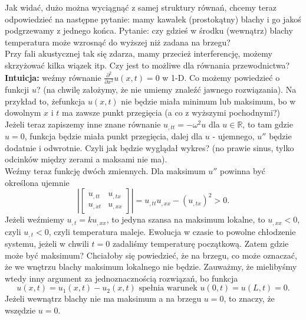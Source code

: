 \documentclass[../main.tex]{subfiles}
\begin{document}
Jak widać, dużo można wyciągnąć z samej struktury równań, chcemy teraz odpowiedzieć na następne pytanie: mamy kawałek (prostokątny) blachy i go jakoś podgrzewamy z jednego końca. Pytanie: czy gdzieś w środku (wewnątrz) blachy temperatura może wzrosnąć do wyższej niż zadana na brzegu?\\
Przy fali akustycznej tak się zdarza, mamy przecież interferencję, możemy skrzyżować kilka wiązek itp. Czy jest to możliwe dla równania przewodnictwa?\\
\textbf{Intuicja:} weźmy równanie $\frac{\partial ^2}{\partial x^2} u(x,t) = 0$ w 1-D. Co możemy powiedzieć o funkcji $u$? (na chwilę założymy, że nie umiemy znaleźć jawnego rozwiązania). Na przykład to, żefunkcja $u(x,t)$ nie będzie miała minimum lub maksimum, bo w dowolnym $x$ i $t$ ma zawsze punkt przegięcia (a co z wyższymi pochodnymi?)\\
Jeżeli teraz zapiszemy inne znane równanie $u_{,t t} = - \omega ^2 u$ dla $u\in \mathbb{R}$, to tam gdzie $u=0$, funkcja będzie miała punkt przegięcia, dalej dla $u$ - ujemnego, $u''$ będzie dodatnie i odwrotnie. Czyli jak będzie wyglądał wykres? (no prawie sinus, tylko odcinków między zerami a maksami nie ma).\\
Weźmy teraz funkcję dwóch zmiennych. Dla maksimum $u''$ powinna być określona ujemnie
\[
		\left| \begin{bmatrix} u_{,t t}&u_{,t x}\\ u_{,xt}&u_{,x x} \end{bmatrix}  \right| = u_{,t t}u_{,x x} - (u_{,tx})^2 > 0
.\]
Jeżeli weźmiemy $u_{,t} = ku_{,x x}$, to jedyna szansa na maksimum lokalne, to $u_{,x x}<0$, czyli $u_{,t}<0$, czyli temperatura maleje. Ewolucja w czasie to powolne chłodzenie systemu, jeżeli w chwili $t=0$ zadaliśmy temperaturę początkową. Zatem gdzie może być maksimum? Chciałoby się powiedzieć, że na brzegu, co może oznaczać, że we wnętrzu blachy maksimum lokalnego nie będzie. Zauważmy, że mielibyśmy wtedy inny argument za jednoznacznością rozwiązań, bo funkcja
\[
		u(x,t) = u_1(x,t) - u_2(x,t) \text{ spełnia warunek }u(0,t) = u(L,t) = 0
.\]
Jeżeli wewnątrz blachy nie ma maksimum a na brzegu $u=0$, to znaczy, że wszędzie $u =0$.
\end{document}
